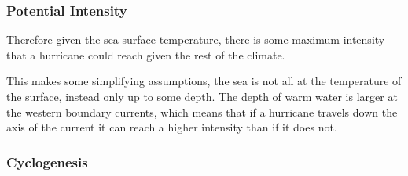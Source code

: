 \subsubsection{Potential Intensity}
\label{sec:potential_intensity}

Therefore given the sea surface temperature, there is some maximum intensity
that a hurricane could reach given the rest of the climate.

This makes some simplifying assumptions, the sea is not all at the temperature
of the surface, instead only up to some depth. The depth of warm water
is larger at the western boundary currents, which means that if a hurricane
travels down the axis of the current it can reach a higher intensity than
if it does not.

\subsubsection{Cyclogenesis}

